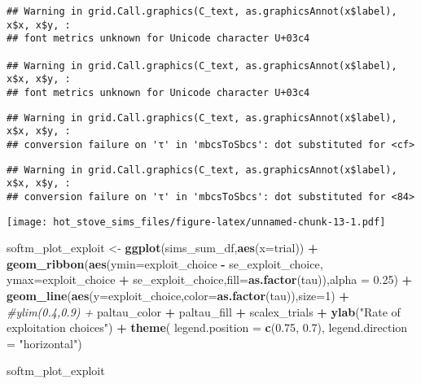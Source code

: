 \documentclass[
]{article}
\newenvironment{Shaded}{\begin{snugshade}}{\end{snugshade}}
\newcommand{\AttributeTok}[1]{\textcolor[rgb]{0.13,0.29,0.53}{#1}}
\newcommand{\CommentTok}[1]{\textcolor[rgb]{0.56,0.35,0.01}{\textit{#1}}}
\newcommand{\DecValTok}[1]{\textcolor[rgb]{0.00,0.00,0.81}{#1}}
\newcommand{\FloatTok}[1]{\textcolor[rgb]{0.00,0.00,0.81}{#1}}
\newcommand{\FunctionTok}[1]{\textcolor[rgb]{0.13,0.29,0.53}{\textbf{#1}}}
\newcommand{\NormalTok}[1]{#1}
\newcommand{\OtherTok}[1]{\textcolor[rgb]{0.56,0.35,0.01}{#1}}
\newcommand{\SpecialCharTok}[1]{\textcolor[rgb]{0.81,0.36,0.00}{\textbf{#1}}}
\newcommand{\StringTok}[1]{\textcolor[rgb]{0.31,0.60,0.02}{#1}}
\begin{document}
\begin{verbatim}
## Warning in grid.Call.graphics(C_text, as.graphicsAnnot(x$label), x$x, x$y, :
## font metrics unknown for Unicode character U+03c4

## Warning in grid.Call.graphics(C_text, as.graphicsAnnot(x$label), x$x, x$y, :
## font metrics unknown for Unicode character U+03c4
\end{verbatim}

\begin{verbatim}
## Warning in grid.Call.graphics(C_text, as.graphicsAnnot(x$label), x$x, x$y, :
## conversion failure on 'τ' in 'mbcsToSbcs': dot substituted for <cf>
\end{verbatim}

\begin{verbatim}
## Warning in grid.Call.graphics(C_text, as.graphicsAnnot(x$label), x$x, x$y, :
## conversion failure on 'τ' in 'mbcsToSbcs': dot substituted for <84>
\end{verbatim}

\texttt{[image: hot\_stove\_sims\_files/figure-latex/unnamed-chunk-13-1.pdf]}

\begin{Shaded}
\begin{Highlighting}[]
\NormalTok{softm\_plot\_exploit }\OtherTok{\textless{}{-}} \FunctionTok{ggplot}\NormalTok{(sims\_sum\_df,}\FunctionTok{aes}\NormalTok{(}\AttributeTok{x=}\NormalTok{trial)) }\SpecialCharTok{+} 
  \FunctionTok{geom\_ribbon}\NormalTok{(}\FunctionTok{aes}\NormalTok{(}\AttributeTok{ymin=}\NormalTok{exploit\_choice }\SpecialCharTok{{-}}\NormalTok{ se\_exploit\_choice, }\AttributeTok{ymax=}\NormalTok{exploit\_choice }\SpecialCharTok{+}\NormalTok{ se\_exploit\_choice,}\AttributeTok{fill=}\FunctionTok{as.factor}\NormalTok{(tau)),}\AttributeTok{alpha =} \FloatTok{0.25}\NormalTok{) }\SpecialCharTok{+}
  \FunctionTok{geom\_line}\NormalTok{(}\FunctionTok{aes}\NormalTok{(}\AttributeTok{y=}\NormalTok{exploit\_choice,}\AttributeTok{color=}\FunctionTok{as.factor}\NormalTok{(tau)),}\AttributeTok{size=}\DecValTok{1}\NormalTok{) }\SpecialCharTok{+}
  \CommentTok{\#ylim(0.4,0.9) + }
\NormalTok{  paltau\_color }\SpecialCharTok{+} 
\NormalTok{  paltau\_fill }\SpecialCharTok{+} 
\NormalTok{  scalex\_trials }\SpecialCharTok{+}
  \FunctionTok{ylab}\NormalTok{(}\StringTok{"Rate of exploitation choices"}\NormalTok{) }\SpecialCharTok{+}
  \FunctionTok{theme}\NormalTok{(}
    \AttributeTok{legend.position =} \FunctionTok{c}\NormalTok{(}\FloatTok{0.75}\NormalTok{, }\FloatTok{0.7}\NormalTok{),}
    \AttributeTok{legend.direction =} \StringTok{"horizontal"}\NormalTok{)}

\NormalTok{softm\_plot\_exploit}
\end{Highlighting}
\end{Shaded}
\end{document}

